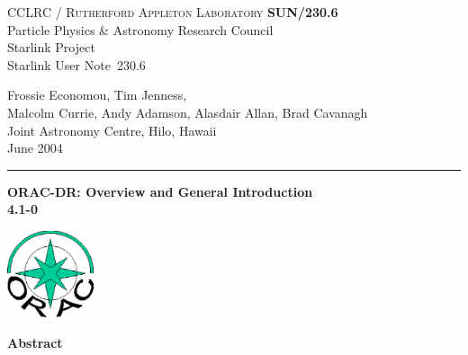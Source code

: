 \documentclass[twoside,11pt]{article}
\newcommand{\stardoccategory}  {Starlink User Note}
\newcommand{\stardocinitials}  {SUN}
\newcommand{\stardocnumber}    {230.6}
\newcommand{\stardocauthors}   {Frossie Economou, Tim Jenness,\\ 
Malcolm Currie, Andy Adamson, Alasdair Allan, Brad Cavanagh\\
Joint Astronomy Centre, Hilo, Hawaii}
\newcommand{\stardocdate}      {June 2004}
\newcommand{\stardoctitle}     {ORAC-DR: Overview and General Introduction}
\newcommand{\stardocversion}   {4.1-0}
\newcommand{\stardocmanual}    {}
\newcommand{\stardocname}{\stardocinitials /\stardocnumber}
\newenvironment{latexonly}{}{}
\renewcommand{\_}{\texttt{\symbol{95}}}
\begin{document}
\thispagestyle{empty}

\begin{latexonly}
   CCLRC / \textsc{Rutherford Appleton Laboratory} \hfill \textbf{\stardocname}\\
   {\large Particle Physics \& Astronomy Research Council}\\
   {\large Starlink Project\\}
   {\large \stardoccategory\ \stardocnumber}
   \begin{flushright}
   \stardocauthors\\
   \stardocdate
   \end{flushright}
   \vspace{-4mm}
   \rule{\textwidth}{0.5mm}
   \vspace{5mm}
   \begin{center}
   {\Huge\textbf{\stardoctitle \\ [2.5ex]}}
   {\LARGE\textbf{\stardocversion \\ [4ex]}}
   {\Huge\textbf{\stardocmanual}}
   \end{center}
   \vspace{5mm}

\begin{center}
\includegraphics[width=1.0in]{sun230_logo.eps}
\end{center}

   \vspace{10mm}
   \begin{center}
      {\Large\textbf{Abstract}}
   \end{center}
\end{latexonly}
\end{document}
